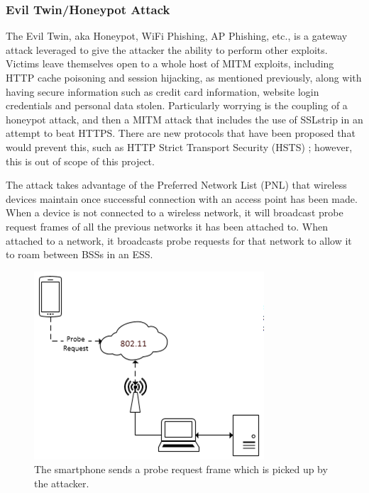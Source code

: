 \clearpage
\subsubsection{Evil Twin/Honeypot Attack}
\label{sec:honeypot}
The Evil Twin, aka Honeypot, WiFi Phishing, AP Phishing, etc., is a gateway attack leveraged to give the attacker the ability to perform other exploits. Victims leave themselves open to a whole host of MITM exploits, including HTTP cache poisoning and session hijacking, as mentioned previously, along with having secure information such as credit card information, website login credentials and personal data stolen. Particularly worrying is the coupling of a honeypot attack, and then a MITM attack that includes the use of SSLstrip \cite{research:youtube}\cite{research:benson} in an attempt to beat HTTPS. There are new protocols that have been proposed that would prevent this, such as HTTP Strict Transport Security (HSTS) \cite{research:hsts}; however, this is out of scope of this project.

The attack takes advantage of the Preferred Network List (PNL) that wireless devices maintain once successful connection with an access point has been made. When a device is not connected to a wireless network, it will broadcast probe request frames of all the previous networks it has been attached to. When attached to a network, it broadcasts probe requests for that network to allow it to roam between BSSs in an ESS. 

\begin{figure}[h!]
\centering\includegraphics{research/attackvectors/figures/honeypot.png}
\caption{The smartphone sends a probe request frame which is picked up by the attacker.}
\end{figure}

